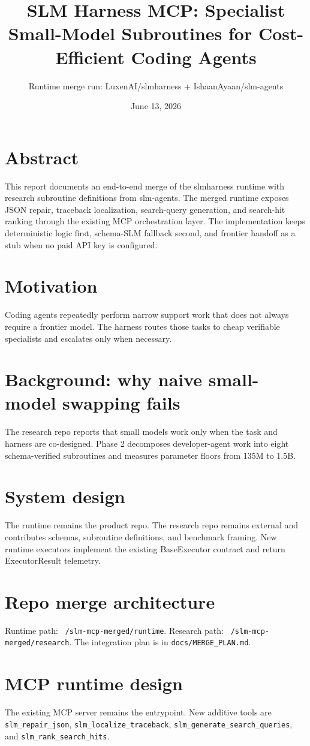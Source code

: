 \documentclass[11pt]{article}
\title{SLM Harness MCP: Specialist Small-Model Subroutines for Cost-Efficient Coding Agents}
\author{Runtime merge run: LuxenAI/slmharness + IshaanAyaan/slm-agents}
\date{June 13, 2026}
\begin{document}
\maketitle
\section{Abstract}
This report documents an end-to-end merge of the slmharness runtime with research subroutine definitions from slm-agents. The merged runtime exposes JSON repair, traceback localization, search-query generation, and search-hit ranking through the existing MCP orchestration layer. The implementation keeps deterministic logic first, schema-SLM fallback second, and frontier handoff as a stub when no paid API key is configured.
\section{Motivation}
Coding agents repeatedly perform narrow support work that does not always require a frontier model. The harness routes those tasks to cheap verifiable specialists and escalates only when necessary.
\section{Background: why naive small-model swapping fails}
The research repo reports that small models work only when the task and harness are co-designed. Phase 2 decomposes developer-agent work into eight schema-verified subroutines and measures parameter floors from 135M to 1.5B.
\section{System design}
The runtime remains the product repo. The research repo remains external and contributes schemas, subroutine definitions, and benchmark framing. New runtime executors implement the existing BaseExecutor contract and return ExecutorResult telemetry.
\section{Repo merge architecture}
Runtime path: \texttt{~/slm-mcp-merged/runtime}. Research path: \texttt{~/slm-mcp-merged/research}. The integration plan is in \texttt{docs/MERGE\_PLAN.md}.
\section{MCP runtime design}
The existing MCP server remains the entrypoint. New additive tools are \texttt{slm\_repair\_json}, \texttt{slm\_localize\_traceback}, \texttt{slm\_generate\_search\_queries}, and \texttt{slm\_rank\_search\_hits}.
\end{document}

